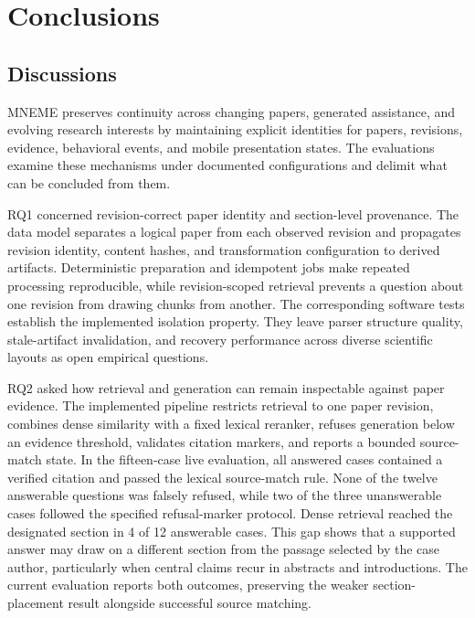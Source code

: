 ﻿%

\chapter{Conclusions}

\section{Discussions}

MNEME preserves continuity across changing papers, generated assistance, and evolving research interests by maintaining explicit identities for papers, revisions, evidence, behavioral events, and mobile presentation states.
The evaluations examine these mechanisms under documented configurations and delimit what can be concluded from them.

RQ1 concerned revision-correct paper identity and section-level provenance.
The data model separates a logical paper from each observed revision and propagates revision identity, content hashes, and transformation configuration to derived artifacts.
Deterministic preparation and idempotent jobs make repeated processing reproducible, while revision-scoped retrieval prevents a question about one revision from drawing chunks from another.
The corresponding software tests establish the implemented isolation property.
They leave parser structure quality, stale-artifact invalidation, and recovery performance across diverse scientific layouts as open empirical questions.

RQ2 asked how retrieval and generation can remain inspectable against paper evidence.
The implemented pipeline restricts retrieval to one paper revision, combines dense similarity with a fixed lexical reranker, refuses generation below an evidence threshold, validates citation markers, and reports a bounded source-match state.
In the fifteen-case live evaluation, all answered cases contained a verified citation and passed the lexical source-match rule.
None of the twelve answerable questions was falsely refused, while two of the three unanswerable cases followed the specified refusal-marker protocol.
Dense retrieval reached the designated section in 4 of 12 answerable cases.
This gap shows that a supported answer may draw on a different section from the passage selected by the case author, particularly when central claims recur in abstracts and introductions.
The current evaluation reports both outcomes, preserving the weaker section-placement result alongside successful source matching.

